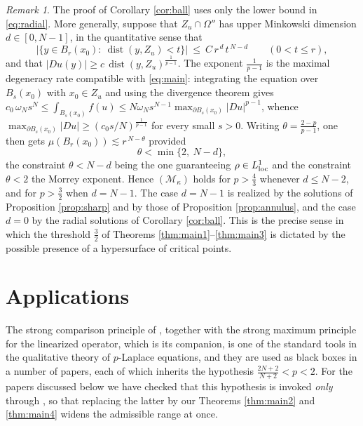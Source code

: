 \documentclass[reqno]{amsart}
\theoremstyle{plain}
\theoremstyle{definition}
\theoremstyle{remark}
\newtheorem{remark}[theorem]{Remark}
\newcommand{\dist}{\operatorname{dist}}
\begin{document}
\begin{remark}\label{rem:minkowski}
The proof of Corollary \ref{cor:ball} uses only the lower bound in \eqref{eq:radial}. More
generally, suppose that $Z_u\cap\Omega''$ has upper Minkowski dimension $d\in[0,N-1]$, in the
quantitative sense that
\[
\big|\{y\in B_r(x_0):\ \dist(y,Z_u)<t\}\big|\ \le\ C\,r^{\,d}\,t^{\,N-d}
\qquad (0<t\le r),
\]
and that $|Du(y)|\ge c\,\dist(y,Z_u)^{\frac1{p-1}}$. The exponent $\frac1{p-1}$ is the maximal
degeneracy rate compatible with \eqref{eq:main}: integrating the equation over $B_s(x_0)$ with
$x_0\in Z_u$ and using the divergence theorem gives
$c_0\,\omega_Ns^{N}\le\int_{B_s(x_0)}f(u)\le N\omega_N s^{N-1}\max_{\partial B_s(x_0)}|Du|^{p-1}$,
whence $\max_{\partial B_s(x_0)}|Du|\ge(c_0s/N)^{\frac1{p-1}}$ for every small $s>0$. Writing $\theta=\frac{2-p}{p-1}$, one then
gets $\mu(B_r(x_0))\lesssim r^{\,N-\theta}$ provided
\[
\theta<\min\{2,\ N-d\} ,
\]
the constraint $\theta<N-d$ being the one guaranteeing $\rho\in L^1_{\rm loc}$ and the constraint
$\theta<2$ the Morrey exponent. Hence $(\mathcal M_\kappa)$ holds for $p>\frac43$ whenever
$d\le N-2$, and for $p>\frac32$ when $d=N-1$. The case $d=N-1$ is realized by the solutions of
Proposition \ref{prop:sharp} and by those of Proposition \ref{prop:annulus}, and the case $d=0$ by
the radial solutions of Corollary
\ref{cor:ball}. This is the precise sense in which the threshold $\frac32$ of Theorems
\ref{thm:main1}--\ref{thm:main3} is dictated by the possible presence of a hypersurface of critical
points.
\end{remark}

\section{Applications}\label{sec:applications}

The strong comparison principle of \cite{DS2}, together with the strong maximum principle for
the linearized operator, which is its companion, is one of the standard tools in the qualitative
theory of $p$-Laplace equations, and they are used as black boxes in a number of papers, each of
which inherits the hypothesis $\frac{2N+2}{N+2}<p<2$. For the papers discussed below we have
checked that this hypothesis is invoked \emph{only} through \cite[Theorems 1.2 and 1.4]{DS2}, so
that replacing the latter by our Theorems \ref{thm:main2} and \ref{thm:main4} widens the admissible
range at once.
\end{document}
